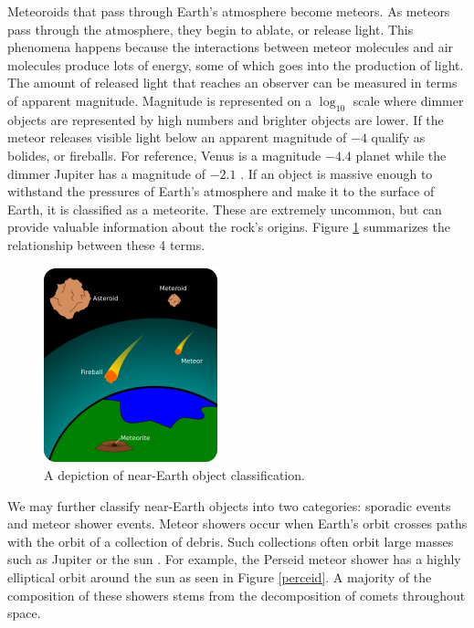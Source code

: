 Meteoroids that pass through Earth's atmosphere become meteors.
As meteors pass through the atmosphere, they begin to ablate, or release light.
This phenomena happens because the interactions between meteor molecules and air molecules produce lots of energy, some of which goes into the production of light.
The amount of released light that reaches an observer can be measured in terms of apparent magnitude.
Magnitude is represented on a $\log_10$ scale where dimmer objects are represented by high numbers and brighter objects are lower.  
If the meteor releases visible light below an apparent magnitude of $-4$ qualify as bolides, or fireballs.
For reference, Venus is a magnitude $-4.4$ planet while the dimmer Jupiter has a magnitude of $-2.1$ \cite{rao_venus_nodate}.
If an object is massive enough to withstand the pressures of Earth's atmosphere and make it to the surface of Earth, it is classified as a meteorite. 
These are extremely uncommon, but can provide valuable information about the rock's origins.
Figure \ref{jed} summarizes the relationship between these 4 terms.

\begin{figure}[ht!]
  \centering
  \includegraphics[scale=0.5]{images/jedmasterpiece.png}
  \caption{A depiction of near-Earth object classification.}
  \label{jed}
\end{figure}

We may further classify near-Earth objects into two categories: sporadic events and meteor shower events.
Meteor showers occur when Earth's orbit crosses paths with the orbit of a collection of debris. 
Such collections often orbit large masses such as Jupiter or the sun \cite{trigo-rodriguez_2006_2007}.  
For example, the Perseid meteor shower has a highly elliptical orbit around the sun as seen in Figure \ref{perceid}.  
A majority of the composition of these showers stems from the decomposition of comets throughout space.

